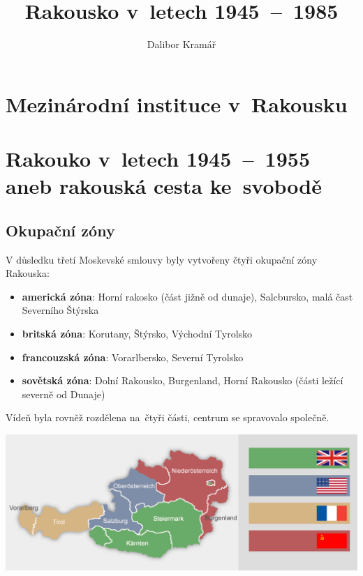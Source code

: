 \documentclass[a3 paper]{article}
\title{Rakousko v~letech 1945~--~1985}
\author{Dalibor Kramář}
\makeatletter
\let\thetitle\@title
\makeatother
\begin{document}
\pagestyle{empty}
\begin{landscape}
\begin{center}
	{\fontsize{1cm}{1cm} \selectfont \textbf{\thetitle}}
\end{center}
\begin{minipage}[c]{\linewidth}
\centering
\begin{minipage}[t]{0.2\linewidth}
	\section*{Mezinárodní instituce v~Rakousku}
	\lipsum[1]
\end{minipage}
\hspace{0.5cm}
\begin{minipage}[t]{0.5\linewidth}
	\section*{Rakouko v~letech 1945~--~1955 aneb rakouská cesta ke~svobodě}
	\subsection*{Okupační zóny}
	V důsledku třetí Moskevské smlouvy byly vytvořeny čtyři okupační zóny Rakouska:
	\begin{itemize}
		\item \textbf{americká zóna}: Horní rakosko (část jižně od dunaje), Salcbursko, malá čast Severního Štýrska
		\item \textbf{britská zóna}: Korutany, Štýrsko, Východní Tyrolsko
		\item \textbf{francouzská zóna}: Vorarlbersko, Severní Tyrolsko
		\item \textbf{sovětská zóna}: Dolní Rakousko, Burgenland, Horní Rakousko (části ležící severně od Dunaje)
	\end{itemize}
	Vídeň byla rovněž rozdělena na~čtyři části, centrum se spravovalo společně. 

	\begin{minipage}[t]{\linewidth}


\includegraphics[width=\linewidth]{images/okupacniZony.png}


\end{minipage}
\end{minipage}
\end{minipage}
\end{landscape}
\end{document}
